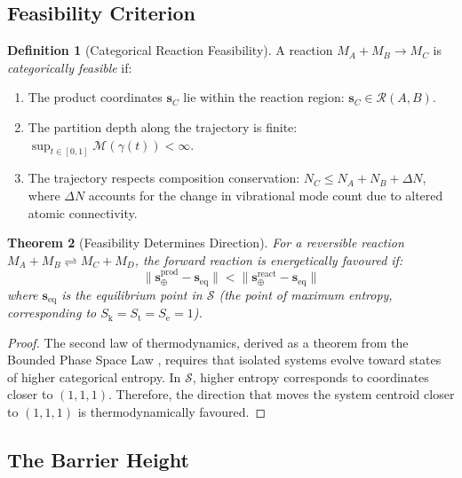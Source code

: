 \documentclass[11pt,twocolumn,a4paper]{article}
\newtheorem{theorem}{Theorem}[section]
\theoremstyle{definition}
\newtheorem{definition}[theorem]{Definition}
\theoremstyle{remark}
\newcommand{\Sk}{S_{\mathrm{k}}}
\newcommand{\St}{S_{\mathrm{t}}}
\newcommand{\Se}{S_{\mathrm{e}}}
\newcommand{\Sspace}{\mathcal{S}}
\newcommand{\Depth}{\mathcal{M}}
\begin{document}
\subsection{Feasibility Criterion}

\begin{definition}[Categorical Reaction Feasibility]
\label{def:feasibility}
A reaction $M_A + M_B \to M_C$ is \emph{categorically feasible} if:
\begin{enumerate}[nosep]
\item The product coordinates $\mathbf{s}_C$ lie within the reaction region: $\mathbf{s}_C \in \mathcal{R}(A, B)$.
\item The partition depth along the trajectory is finite: $\sup_{t \in [0,1]} \Depth(\gamma(t)) < \infty$.
\item The trajectory respects composition conservation: $N_C \leq N_A + N_B + \Delta N$, where $\Delta N$ accounts for the change in vibrational mode count due to altered atomic connectivity.
\end{enumerate}
\end{definition}

\begin{theorem}[Feasibility Determines Direction]
\label{thm:direction}
For a reversible reaction $M_A + M_B \rightleftharpoons M_C + M_D$, the forward reaction is energetically favoured if:
\begin{equation}
\|\mathbf{s}_{\oplus}^{\mathrm{prod}} - \mathbf{s}_{\mathrm{eq}}\| < \|\mathbf{s}_{\oplus}^{\mathrm{react}} - \mathbf{s}_{\mathrm{eq}}\|
\label{eq:direction}
\end{equation}
where $\mathbf{s}_{\mathrm{eq}}$ is the equilibrium point in $\Sspace$ (the point of maximum entropy, corresponding to $\Sk = \St = \Se = 1$).
\end{theorem}

\begin{proof}
The second law of thermodynamics, derived as a theorem from the Bounded Phase Space Law \citep{sachikonye2025a}, requires that isolated systems evolve toward states of higher categorical entropy. In $\Sspace$, higher entropy corresponds to coordinates closer to $(1, 1, 1)$. Therefore, the direction that moves the system centroid closer to $(1, 1, 1)$ is thermodynamically favoured.
\end{proof}

\subsection{The Barrier Height}
\end{document}
